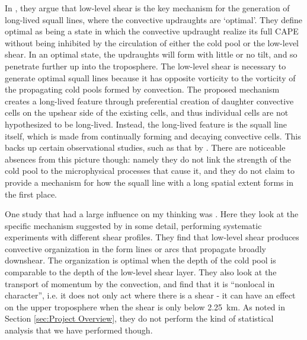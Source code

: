 \documentclass[11pt,a4paper]{article}
\newcommand\todo[1]{\textbf{TODO: #1}}
\begin{document}
In \cite{RKW1988}, they argue that low-level shear is the key mechanism for the generation of long-lived squall lines, where the convective updraughts are `optimal'. They define optimal as being a state in which the convective updraught realize its full CAPE without being inhibited by the circulation of either the cold pool or the low-level shear. In an optimal state, the updraughts will form with little or no tilt, and so penetrate further up into the troposphere. The low-level shear is necessary to generate optimal squall lines because it has opposite vorticity to the vorticity of the propagating cold pools formed by convection. The proposed mechanism creates a long-lived feature through preferential creation of daughter convective cells on the upshear side of the existing cells, and thus individual cells are not hypothesized to be long-lived. Instead, the long-lived feature is the squall line itself, which is made from continually forming and decaying convective cells. This backs up certain observational studies, such as that by \cite{houze1977structure}. There are noticeable absences from this picture though: namely they do not link the strength of the cold pool to the microphysical processes that cause it, and they do not claim to provide a mechanism for how the squall line with a long spatial extent forms in the first place. %

One study that had a large influence on my thinking was \cite{RE2001}. Here they look at the specific mechanism suggested by \cite{RKW1988} in some detail, performing systematic experiments with different shear profiles. They find that low-level shear produces convective organization in the form lines or arcs that propagate broadly downshear. The organization is optimal when the depth of the cold pool is comparable to the depth of the low-level shear layer. They also look at the transport of momentum by the convection, and find that it is ``nonlocal in character'', i.e. it does not only act where there is a shear - it can have an effect on the upper troposphere when the shear is only below \SI{2.25}{km}. As noted in Section \ref{sec:Project Overview}, they do not perform the kind of statistical analysis that we have performed though.


\end{document}
